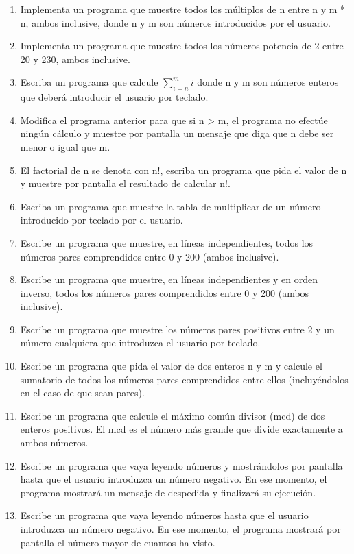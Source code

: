 \begin{enumerate}
\item Implementa un programa que muestre todos los múltiplos de n entre n y m * n, ambos inclusive, donde n y m son números introducidos por el usuario.

\item Implementa un programa que muestre todos los números potencia de 2 entre 20 y 230, ambos inclusive.

\item Escriba un programa que calcule $ \sum_{i=n}^{m} i$ donde n y m son números enteros que deberá introducir el usuario por teclado.

\item Modifica el programa anterior para que si n > m, el programa no efectúe ningún cálculo y muestre por pantalla un mensaje que diga que n debe ser menor o igual que m.

\item El factorial de n se denota con n!, escriba un programa que pida el valor de n y muestre por pantalla el resultado de
calcular n!.

\item Escriba un programa que muestre la tabla de multiplicar de un número introducido por teclado por el usuario.

\item Escribe un programa que muestre, en líneas independientes, todos los números pares comprendidos entre 0 y 200 (ambos inclusive).

\item Escribe un programa que muestre, en líneas independientes y en orden inverso, todos los números pares comprendidos entre 0 y 200 (ambos inclusive).

\item Escribe un programa que muestre los números pares positivos entre 2 y un número cualquiera que introduzca el usuario por teclado.

\item Escribe un programa que pida el valor de dos enteros n y m y calcule el sumatorio de todos los números pares comprendidos entre ellos (incluyéndolos en el caso de que sean pares).

\item Escribe un programa que calcule el máximo común divisor (mcd) de dos enteros positivos. El mcd es el número más grande que divide exactamente a ambos números.

\item Escribe un programa que vaya leyendo números y mostrándolos por pantalla hasta que el usuario introduzca un número negativo. En ese momento, el programa mostrará un mensaje de despedida y finalizará su ejecución.

\item Escribe un programa que vaya leyendo números hasta que el usuario introduzca un número negativo. En ese momento, el programa mostrará por pantalla el número mayor de cuantos ha visto.
\end{enumerate}






